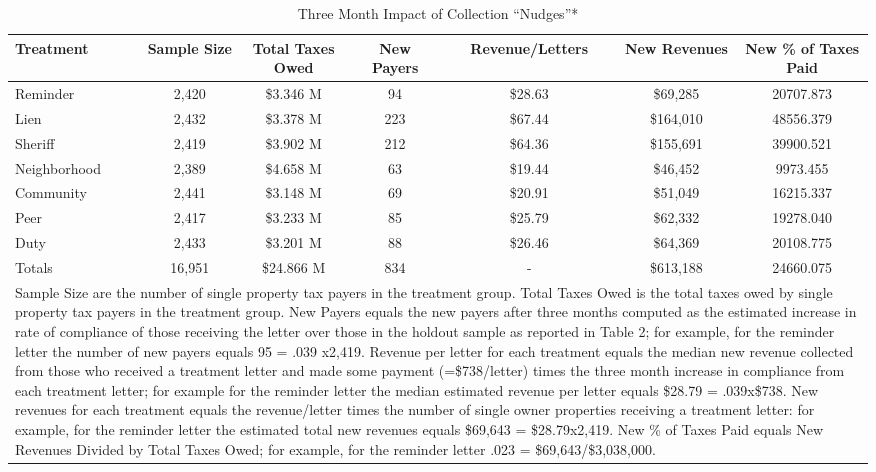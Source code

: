 \begin{table}[htb]
\centering
\caption{Three Month Impact of Collection ``Nudges''*} 
\label{sh_rev}
\begin{tabular}{lcccccc}
 Treatment & Sample Size & Total Taxes Owed & New Payers & Revenue/Letters & New Revenues & New \% of Taxes Paid \\ 
  \hline
Reminder & 2,420 & \$3.346 M & 94 & \$28.63 & \$69,285 & 20707.873 \\ 
   \hline
Lien & 2,432 & \$3.378 M & 223 & \$67.44 & \$164,010 & 48556.379 \\ 
  Sheriff & 2,419 & \$3.902 M & 212 & \$64.36 & \$155,691 & 39900.521 \\ 
  Neighborhood & 2,389 & \$4.658 M & 63 & \$19.44 & \$46,452 & 9973.455 \\ 
  Community & 2,441 & \$3.148 M & 69 & \$20.91 & \$51,049 & 16215.337 \\ 
  Peer & 2,417 & \$3.233 M & 85 & \$25.79 & \$62,332 & 19278.040 \\ 
  Duty & 2,433 & \$3.201 M & 88 & \$26.46 & \$64,369 & 20108.775 \\ 
   \hline
   \hline
Totals & 16,951 & \$24.866 M & 834 & - & \$613,188 & 24660.075 \\ 
   \hline
\multicolumn{7}{p{1\textwidth}}{\scriptsize* Sample Size are the number of single property tax payers in the treatment group.  Total Taxes Owed is the  total taxes owed by single property tax payers in the treatment group. New Payers equals the new payers after three months computed as the estimated increase in rate of compliance of those receiving the letter over those in the holdout sample as reported in Table 2; for example, for the reminder letter the number of new payers equals 95 = .039 x2,419.  Revenue per letter for each treatment equals the median new revenue collected from those who received a treatment letter and made some payment (=\$738/letter) times the three month increase in compliance from each treatment letter; for example for the reminder letter the median estimated revenue per letter equals \$28.79 = .039x\$738.  New revenues for each treatment equals the revenue/letter times the number of single owner properties receiving a treatment letter: for example, for the reminder letter the estimated total new revenues equals \$69,643 = \$28.79x2,419.  New \% of Taxes Paid equals New Revenues Divided by Total Taxes Owed; for example, for the reminder letter .023 = \$69,643/\$3,038,000.}
\end{tabular}
\end{table}


